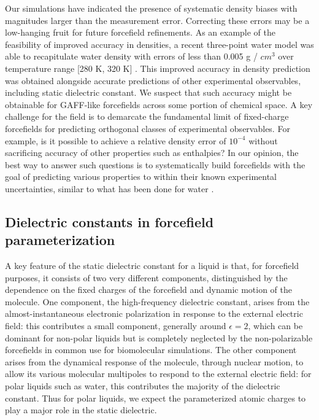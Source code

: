 \documentclass[aps,pre,twocolumn,nofootinbib,superscriptaddress,linenumbers]{revtex4-1}
\begin{document}
Our simulations have indicated the presence of systematic density biases with magnitudes larger than the measurement error.  
Correcting these errors may be a low-hanging fruit for future forcefield refinements.
As an example of the feasibility of improved accuracy in densities, a recent three-point water model was able to recapitulate water density with errors of less than 0.005 g / $cm^{3}$ over temperature range [280 K, 320 K] \cite{wang2014building}.
This improved accuracy in density prediction was obtained alongside accurate predictions of other experimental observables, including static dielectric constant.  
We suspect that such accuracy might be obtainable for GAFF-like forcefields across some portion of chemical space.  
A key challenge for the field is to demarcate the fundamental limit of fixed-charge forcefields for predicting orthogonal classes of experimental observables.
For example, is it possible to achieve a relative density error of $10^{-4}$ without sacrificing accuracy of other properties such as enthalpies?
In our opinion, the best way to answer such questions is to systematically build forcefields with the goal of predicting various properties to within their known experimental uncertainties, similar to what has been done for water \cite{horn2004, wang2014building}.



\subsection{Dielectric constants in forcefield parameterization}


A key feature of the static dielectric constant for a liquid is that, for forcefield purposes, it consists of two very different components, distinguished by the dependence on the fixed charges of the forcefield and dynamic motion of the molecule. One component, the high-frequency dielectric constant, arises from the almost-instantaneous electronic polarization in response to the external electric field: this contributes a small component, generally around $\epsilon = 2$, which can be dominant for non-polar liquids but is completely neglected by the non-polarizable forcefields in common use for biomolecular simulations. The other component arises from the dynamical response of the molecule, through nuclear motion, to allow its various molecular multipoles to respond to the external electric field: for polar liquids such as water, this contributes the majority of the dielectric constant. Thus for polar liquids, we expect the parameterized atomic charges to play a major role in the static dielectric.  
\end{document}
